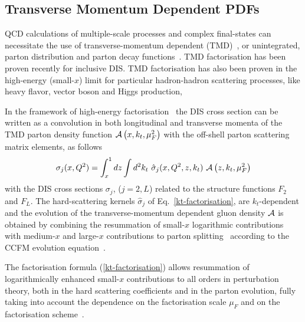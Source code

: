 \subsection{Transverse Momentum Dependent PDFs}


\def\kt{\ensuremath{k_t}}
\def\pt{\ensuremath{p_t}}


QCD calculations of multiple-scale processes  and complex final-states
can necessitate the use of transverse-momentum dependent (TMD)~\cite{Collins:2011zzd}, or 
unintegrated, parton distribution and parton decay 
functions~\cite{Aybat:2011zv,Buffing:2013eka,Buffing:2013kca,Buffing:2012sz,Mulders:2008tf,Jadach:2009gm,Hautmann:2009zzb,Hautmann:2012pf,Hautmann:2007gw}.   
TMD factorisation has been proven recently \cite{Collins:2011zzd} for inclusive DIS. TMD factorisation has also been proven in the high-energy (small-$x$) limit \cite{Catani:1990xk,Collins:1991ty,Hautmann:2010be} for 
particular hadron-hadron scattering processes, like heavy flavor, vector boson and Higgs production, 
  
In the framework of high-energy factorisation~\cite{Catani:1990xk,Catani:1990eg,Catani:1993ww} 
the DIS cross section can be written as a convolution in 
both longitudinal and transverse momenta of the TMD parton density function 
${\cal A}\left(x,\kt,\mu_{F}^2\right)$    
 with the off-shell parton scattering matrix elements, as follows 
\begin{equation}
 \sigma_j (x, Q^2) = \int_x^1  
d z \int d^2k_t \ 
\hat{\sigma}_j(x,Q^2,{z},k_t) \ 
 {\cal  A}\left( {z} ,\kt, \mu_{F}^2 \right) 
\label{kt-factorisation}
\end{equation}
with the DIS cross sections 
$\sigma_j$, ($j= 2 , L$) related to the  structure functions $F_2$ and $F_L$.
The hard-scattering kernels ${\hat \sigma}_j$ of Eq.~\ref{kt-factorisation},    are $k_t$-dependent and the evolution  of the 
transverse-momentum dependent gluon density 
${\cal A} $ is obtained by combining the resummation of small-$x$ logarithmic 
contributions \cite{Lipatov:1996ts,Fadin:1975cb,Balitsky:1978ic} with medium-$x$ and large-$x$ 
contributions to parton  splitting~\cite{Gribov:1972ri,Altarelli:1977zs,Dokshitzer:1977sg} according to the 
CCFM evolution equation~\cite{Ciafaloni:1987ur,Catani:1989sg,Marchesini:1994wr}.
  
The factorisation formula (\ref{kt-factorisation})  
allows resummation of logarithmically enhanced small-$x$ contributions  
to all orders in perturbation theory,  
both in the  hard scattering coefficients and 
in the parton evolution, fully taking into account the 
dependence on the factorisation scale $\mu_{F}$ and on the 
factorisation scheme~\cite{Catani:1994sq,Catani:1993rn}.  
 
